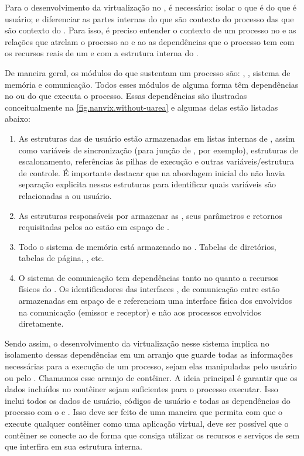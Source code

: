 Para o desenvolvimento da virtualização no \nanvix, é necessário: isolar o que é  do que é usuário; e diferenciar as partes internas do  que são contexto do processo das que são contexto do \cluster. Para isso, é preciso entender o contexto de um processo no \nanvix e as relações que atrelam o processo ao \cluster e ao \so \ie as dependências que o processo tem com os recursos reais de um \cluster e com a estrutura interna do \so. 

De maneira geral, os módulos do \nanvix que sustentam um processo são: \threads, \syscalls, sistema de memória e comunicação. Todos esses módulos de alguma forma têm dependências no  ou \hardware do \cluster que executa o processo. Essas dependências são ilustradas conceitualmente na \autoref{fig.nanvix.without-uarea} e algumas delas estão listadas abaixo:

\begin{enumerate}[label=(\roman*)]
    \item As estruturas das \threads de usuário estão armazenadas em listas internas de , assim como variáveis de sincronização (para junção de \threads, por exemplo), estruturas de escalonamento, referências às pilhas de execução e outras variáveis/estrutura de controle. É importante destacar que na abordagem inicial do \nanvix não havia separação explicita nessas estruturas para identificar quais variáveis são relacionadas a  ou usuário.
    \item As estruturas responsáveis por armazenar as \syscalls, seus parâmetros e retornos requisitadas pelos \scores ao \mcore estão em espaço de .
    \item Todo o sistema de memória está armazenado no . Tabelas de diretórios, tabelas de página, \tlbs, etc.
    \item O sistema de comunicação tem dependências tanto no  quanto a recursos físicos do \cluster. Os identificadores das interfaces \noc, \ie de comunicação entre \clusters estão armazenadas em espaço de  e referenciam uma interface física dos \clusters envolvidos na comunicação (emissor e receptor) e não aos processos envolvidos diretamente.
\end{enumerate}

Sendo assim, o desenvolvimento da virtualização nesse sistema implica no isolamento dessas dependências em um arranjo que guarde todas as informações necessárias para a execução de um processo, sejam elas manipuladas pelo usuário ou pelo . Chamamos esse arranjo de contêiner. A ideia principal é garantir que os dados incluídos no contêiner sejam suficientes para o processo executar. Isso inclui todos os dados de usuário, códigos de usuário e todas as dependências do processo com o  e \cluster. Isso deve ser feito de uma maneira que permita com que o  execute qualquer contêiner como uma aplicação virtual, \ie deve ser possível que o contêiner se conecte ao  de forma que consiga utilizar os recursos e serviços de  sem que interfira em sua estrutura interna.


